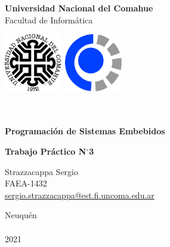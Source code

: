 \titlepage

\begin{center}

    \vspace{-1cm}

    {\Large{\bf \sc Universidad Nacional del Comahue}} \\
    {\Large{\sc Facultad de Informática}}

    \vspace{-2.5cm}

    \mbox{\includegraphics[width=2.5cm,height=2.5cm]{img/caratula/unc.png}\hspace{10cm} \includegraphics[width=2.5cm,height=2.5cm]{img/caratula/fai.png}}

    \vspace{1cm}

    \ \\
    \ \\

    {\Large {\bf \sc Programación de Sistemas Embebidos}} \\

    \vspace{2cm}

    {\LARGE {\bf \sc Trabajo Práctico N$^\circ$3}} \\

    \vspace{1.5cm}

    {\Large Strazzacappa Sergio} \\
    \vspace{1.5em}
    {\Large FAEA-1432} \\
    \vspace{1.5em}
    {\Large \href{mailto:sergio.strazzacappa@est.fi.uncoma.edu.ar}{sergio.strazzacappa@est.fi.uncoma.edu.ar}}

    \vfill

    {\Large {\sc Neuqu\'en}\hspace{6cm}{\sc Argentina}} \\ \ \\

    {\Large 2021} \\

    \pagebreak

\end{center}